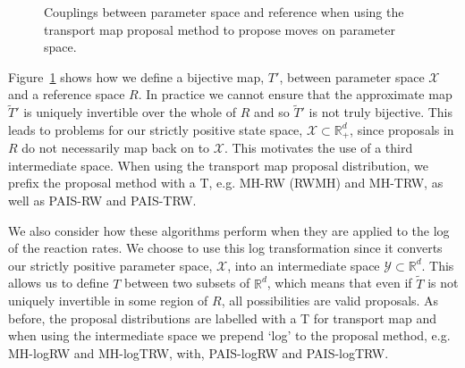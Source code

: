 \documentclass[final]{siamltex}
\newcommand\irregularcircle[2]{%
  \pgfextra {\pgfmathsetmacro\len{(#1)+rand*(#2)}}
  +(0:\len pt)
  \foreach \a in {10,20,...,350}{
    \pgfextra {\pgfmathsetmacro\len{(#1)+rand*(#2)}}
    -- +(\a:\len pt)
  } -- cycle
}
\begin{document}
\begin{figure}
	\centering
	\caption{Couplings between parameter space and reference when using the transport map proposal method to propose moves on parameter space.}
	\label{fig:chem_coupling}
\end{figure}

Figure~\ref{fig:chem_coupling} shows how we define a bijective map, $T'$, between parameter space $\mathcal{X}$ and a reference space $R$. In practice we cannot ensure that the approximate map $\tilde{T}'$ is uniquely invertible over the whole of $R$ and so $\tilde{T}'$ is not truly bijective. This leads to problems for our strictly positive state space, $\mathcal{X} \subset \mathbb{R}_+^d$, since proposals in $R$ do not necessarily map back on to $\mathcal{X}$. This motivates the use of a third intermediate space. When using the transport map proposal distribution, we prefix the proposal method with a T, e.g. MH-RW (RWMH) and MH-TRW, as well as PAIS-RW and PAIS-TRW.

We also consider how these algorithms perform when they are applied to the log of the reaction rates. We choose to use this log transformation since it converts our strictly positive parameter space, $\mathcal{X}$, into an intermediate space $\mathcal{Y} \subset \mathbb{R}^d$. This allows us to define $T$ between two subsets of $\mathbb{R}^d$, which means that even if $\tilde{T}$ is not uniquely invertible in some region of $R$, all possibilities are valid proposals. As before, the proposal distributions are labelled with a T for transport map and when using the intermediate space we prepend `log' to the proposal method, e.g. MH-logRW and MH-logTRW, with, PAIS-logRW and PAIS-logTRW.
\end{document}

